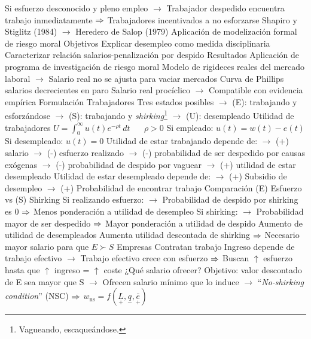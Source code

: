 \documentclass{nuevotema}
\begin{document}
\begin{esquemal}
				\4[] Si esfuerzo desconocido y pleno empleo
				\4[] $\to$ Trabajador despedido encuentra trabajo inmediatamente
				\4[] $\Rightarrow$ Trabajadores incentivados a no esforzarse
				\4[]  Shapiro y Stiglitz (1984)
				\4[] $\to$ Heredero de Salop (1979)
				\4[] Aplicación de modelización formal de riesgo moral
				\4 Objetivos
				\4[] Explicar desempleo como medida disciplinaria
				\4[] Caracterizar relación salarios-penalización por despido
				\4 Resultados
				\4[] Aplicación de programa de investigación de riesgo moral
				\4[] Modelo de rigideces reales del mercado laboral
				\4[] $\to$ Salario real no se ajusta para vaciar mercados
				\4[] Curva de Phillips salarios decrecientes en paro
				\4[] Salario real procíclico
				\4[] $\to$ Compatible con evidencia empírica
			\3 Formulación
				\4 Trabajadores
				\4[] Tres estados posibles
				\4[] $\to$ (E): trabajando y esforzándose
				\4[] $\to$ (S): trabajando y \textit{shirking}\footnote{Vagueando, escaqueándose.}
				\4[] $\to$ (U): desempleado
				\4 Utilidad de trabajadores
				\4[] $U = \int_0^\infty  u(t) e^{-\rho t} \, dt$ $\quad$ $\rho > 0$
				\4[] Si empleado: $u(t) = w(t) - e(t)$
				\4[] Si desempleado: $u(t) = 0$
				\4 Utilidad de estar trabajando depende de:
				\4[] $\to$ (+) salario
				\4[] $\to$ (-) esfuerzo realizado
				\4[] $\to$ (-) probabilidad de ser despedido por causas exógenas
				\4[] $\to$ (-) probabilidad de despido por vaguear
				\4[] $\to$ (+) utilidad de estar desempleado
				\4 Utilidad de estar desempleado depende de:
				\4[] $\to$ (+) Subsidio de desempleo
				\4[] $\to$ (+) Probabilidad de encontrar trabajo
				\4 Comparación (E) Esfuerzo vs (S) Shirking
				\4[] Si realizando esfuerzo:
				\4[] $\to$ Probabilidad de despido por shirking es 0
				\4[] $\Rightarrow$ Menos ponderación a utilidad de desempleo
				\4[] Si shirking:
				\4[] $\to$ Probabilidad mayor de ser despedido
				\4[] $\Rightarrow$ Mayor ponderación a utilidad de despido
				\4 Aumento de utilidad de desempleados
				\4[] Aumenta utilidad descontada de shirking
				\4[] $\Rightarrow$ Necesario mayor salario para que $E \succ S$
				\4 Empresas
				\4[] Contratan trabajo
				\4[] Ingreso depende de trabajo efectivo
				\4[] $\to$ Trabajo efectivo crece con esfuerzo
				\4[] $\Rightarrow$ Buscan $\uparrow$ esfuerzo hasta que $\uparrow$ ingreso = $\uparrow$ coste
				\4 ¿Qué salario ofrecer?
				\4[] Objetivo: valor descontado de E sea mayor que S
				\4[] $\to$ Ofrecen salario mínimo que lo induce
				\4[] $\to$ ``\textit{No-shirking condition}'' (NSC)
				\4[] $\Rightarrow$ $w_\text{ns} = f(\underset{+}{L}, \underset{-}{q}, \underset{+}{\bar{e}})$

\end{esquemal}
\end{document}
